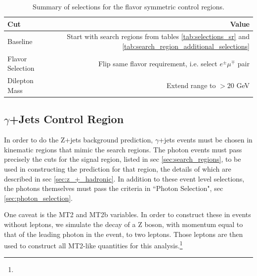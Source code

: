     \begin{table}[htb]
    \begin{center}
      \caption{\label{tab:flavor_symmetric_control_regions} 
        Summary of selections for the flavor symmetric control regions.
      }
      \begin{tabular}{l|r}\hline
      Cut & Value \\
      \hline 
      \hline
      Baseline                      & Start with search regions from tables \ref{tab:selections_sr} and \ref{tab:search_region_additional_selections}  \\
      Flavor Selection              & Flip same flavor requirement, i.e. select $e^\pm\mu^\mp$ pair \\
      Dilepton Mass                 & Extend range to $>20$ GeV \\
      \hline
      \hline
      \end{tabular}
    \end{center}
  \end{table} 

  \subsection{$\gamma$+Jets Control Region} \label{sec:met_templates_control_region}

    In order to do the Z+jets background prediction, $\gamma$+jets events must be chosen in kinematic regions that mimic the search regions. The photon events must pass precisely the cuts for the signal region, listed in sec \ref{sec:search_regions}, to be used in constructing the prediction for that region, the details of which are described in sec \ref{sec:z_+_hadronic}. In addition to these event level selections, the photons themselves must pass the criteria in ``Photon Selection", sec \ref{sec:photon_selection}.

    One caveat is the MT2 and MT2b variables. In order to construct these in events without leptons, we simulate the decay of a Z boson, with momentum equal to that of the leading photon in the event, to two leptons. Those leptons are then used to construct all MT2-like quantities for this analysis.\footnote{}

